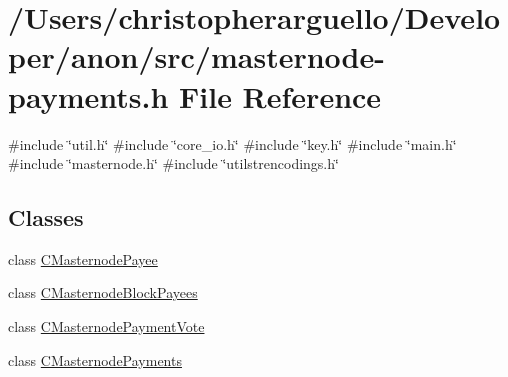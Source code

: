 \hypertarget{masternode-payments_8h}{}\section{/\+Users/christopherarguello/\+Developer/anon/src/masternode-\/payments.h File Reference}
\label{masternode-payments_8h}
{\ttfamily \#include \char`\"{}util.\+h\char`\"{}}\newline
{\ttfamily \#include \char`\"{}core\+\_\+io.\+h\char`\"{}}\newline
{\ttfamily \#include \char`\"{}key.\+h\char`\"{}}\newline
{\ttfamily \#include \char`\"{}main.\+h\char`\"{}}\newline
{\ttfamily \#include \char`\"{}masternode.\+h\char`\"{}}\newline
{\ttfamily \#include \char`\"{}utilstrencodings.\+h\char`\"{}}\newline
\subsection*{Classes}
\begin{DoxyCompactItemize}
\item 
class \mbox{\hyperlink{class_c_masternode_payee}{C\+Masternode\+Payee}}
\item 
class \mbox{\hyperlink{class_c_masternode_block_payees}{C\+Masternode\+Block\+Payees}}
\item 
class \mbox{\hyperlink{class_c_masternode_payment_vote}{C\+Masternode\+Payment\+Vote}}
\item 
class \mbox{\hyperlink{class_c_masternode_payments}{C\+Masternode\+Payments}}
\end{DoxyCompactItemize}
